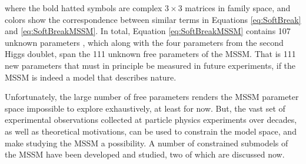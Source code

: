 where the bold hatted symbols are complex $3\times3$ matrices in family space, and colors show the correspondence between similar terms in Equations \ref{eq:SoftBreak} and \ref{eq:SoftBreakMSSM}. In total, Equation \ref{eq:SoftBreakMSSM} contains 107 unknown parameters \cite{Dimopoulos:1995ju}, which along with the four parameters from the second Higgs doublet, span the 111 unknown free parameters of the MSSM. That is 111 new parameters that must in principle be measured in future experiments, if the MSSM is indeed a model that describes nature.

Unfortunately, the large number of free parameters renders the MSSM parameter space impossible to explore exhaustively, at least for now. But, the vast set of experimental observations collected at particle physics experiments over decades, as well as theoretical motivations, can be used to constrain the model space, and make studying the MSSM a possibility. A number of constrained submodels of the MSSM have been developed and studied, two of which are discussed now.

